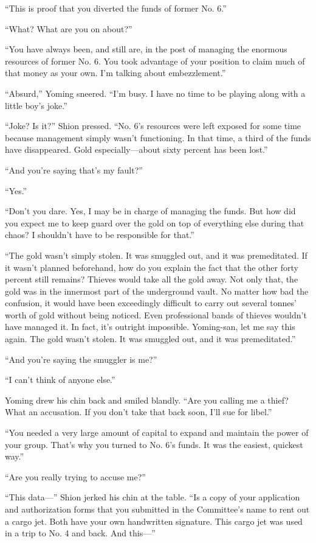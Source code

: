 ``This is proof that you diverted the funds of former No. 6.''

``What? What are you on about?''

``You have always been, and still are, in the post of managing the
enormous resources of former No. 6. You took advantage of your position
to claim much of that money as your own. I'm talking about
embezzlement.''

``Absurd,'' Yoming sneered. ``I'm busy. I have no time to be playing
along with a little boy's joke.''

``Joke? Is it?'' Shion pressed. ``No. 6's resources were left exposed
for some time because management simply wasn't functioning. In that
time, a third of the funds have disappeared. Gold especially---about sixty
percent has been lost.''

``And you're saying that's my fault?''

``Yes.''

``Don't you dare. Yes, I may be in charge of managing the funds. But how
did you expect me to keep guard over the gold on top of everything else
during that chaos? I shouldn't have to be responsible for that.''

``The gold wasn't simply stolen. It was smuggled out, and it was
premeditated. If it wasn't planned beforehand, how do you explain the
fact that the other forty percent still remains? Thieves would take all
the gold away. Not only that, the gold was in the innermost part of the
underground vault. No matter how bad the confusion, it would have been
exceedingly difficult to carry out several tonnes' worth of gold without
being noticed. Even professional bands of thieves wouldn't have managed
it. In fact, it's outright impossible. Yoming-san, let me say this
again. The gold wasn't stolen. It was smuggled out, and it was
premeditated.''

``And you're saying the smuggler is me?''

``I can't think of anyone else.''

Yoming drew his chin back and smiled blandly. ``Are you calling me a
thief? What an accusation. If you don't take that back soon, I'll sue
for libel.''

``You needed a very large amount of capital to expand and maintain the
power of your group. That's why you turned to No. 6's funds. It was the
easiest, quickest way.''

``Are you really trying to accuse me?''

``This data---'' Shion jerked his chin at the table. ``Is a copy of your
application and authorization forms that you submitted in the
Committee's name to rent out a cargo jet. Both have your own handwritten
signature. This cargo jet was used in a trip to No. 4 and back. And
this---''

